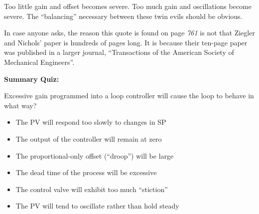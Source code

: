 







Too little gain and offset becomes severe.  Too much gain and oscillations become severe.  The ``balancing'' necessary between these twin evils should be obvious.

\vskip 10pt

In case anyone asks, the reason this quote is found on page {\it 761} is not that Ziegler and Nichols' paper is hundreds of pages long.  It is because their ten-page paper was published in a larger journal, ``Transactions of the American Society of Mechanical Engineers''.











\vfil \eject

\noindent
{\bf Summary Quiz:}

Excessive gain programmed into a loop controller will cause the loop to behave in what way?

\begin{itemize}
\item{} The PV will respond too slowly to changes in SP
\vskip 5pt 
\item{} The output of the controller will remain at zero
\vskip 5pt 
\item{} The proportional-only offset (``droop'') will be large
\vskip 5pt 
\item{} The dead time of the process will be excessive
\vskip 5pt 
\item{} The control valve will exhibit too much ``stiction''
\vskip 5pt 
\item{} The PV will tend to oscillate rather than hold steady
\end{itemize}




